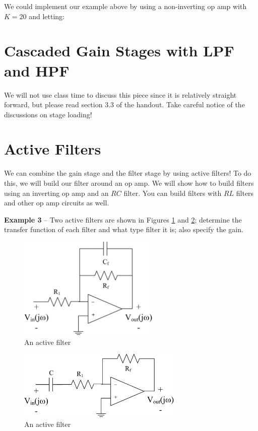 \documentclass{handout}
\begin{document}
We could implement our example above by using a non-inverting op amp with $K=20$ and letting:

\section{Cascaded Gain Stages with LPF and HPF}
We will not use class time to discuss this piece since it is relatively straight forward, but please read section 3.3 of the handout.  Take careful notice of the discussions on stage loading!

\newpage
\clearpage
\pagebreak

\section{Active Filters}
We can combine the gain stage and the filter stage by using active filters!  To do this, we will build our filter around an op amp.  We will show how to build filters using an inverting op amp and an $RC$ filter.  You can build filters with $RL$ filters and other op amp circuits as well.

\textbf{Example 3}  -- Two active filters are shown in Figures \ref{fig: ActiveLPF} and \ref{fig: ActiveHPF}; determine the transfer function of each filter and what type filter it is; also specify the gain.
\begin{figure} [h!]
\centering
\includegraphics[width=0.6\textwidth]{ActiveLPF.jpg}
\caption{An active filter}
\label{fig: ActiveLPF}
\end{figure}
\begin{figure} [h!]
\centering
\includegraphics[width=0.7\textwidth]{ActiveHPF.jpg}
\caption{An active filter}
\label{fig: ActiveHPF}
\end{figure}
\end{document}
